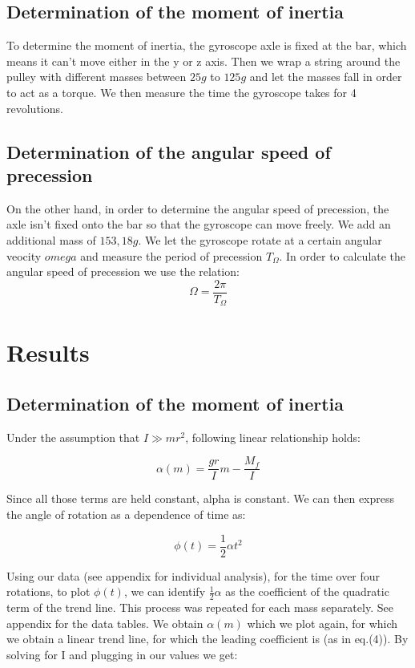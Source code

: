 \documentclass{scrartcl}
\begin{document}
\subsection{Determination of the moment of inertia}
To determine the moment of inertia, the gyroscope axle is fixed at the bar, which means it can't move either in the y or z axis. Then we wrap a string around the pulley with different masses between $25g$ to $125g$ and let the masses fall in order to act as a torque. We then measure the time the gyroscope takes for 4 revolutions. 

\subsection{Determination of the angular speed of precession}
On the other hand, in order to determine the angular speed of precession, the axle isn't fixed onto the bar so that the gyroscope can move freely. We add an additional mass of $153,18g$. We let the gyroscope rotate at a certain angular veocity $omega$ and measure the period of precession $T_{\Omega}$. In order to calculate the angular speed of precession we use the relation:
\begin{equation}
	\Omega = \frac{2\pi}{T_{\Omega}}
	\label{eq3}
\end{equation}

\section{Results}

\subsection{Determination of the moment of inertia}

    Under the assumption that $I \gg mr^2$, following linear relationship holds:
    
    \begin{equation}
        \alpha (m) = \frac{gr}{I} m - \frac{M_f}{I}
    \end{equation}
    
    Since all those terms are held constant, alpha is constant. We can then express the angle of rotation as a dependence of time as:
    
    \begin{equation}
        \phi(t) = \frac{1}{2} \alpha t^2
    \end{equation}

    Using our data (see appendix for individual analysis), for the time over four rotations, to plot $\phi(t)$, we can identify
    $\frac{1}{2} \alpha$ as the coefficient of the quadratic term of the trend line. This process was repeated for each mass separately. See appendix for the data tables. We obtain $\alpha(m)$ which we plot again, for which we obtain a linear trend line, for which the leading coefficient is (as in eq.(4)). By solving for I and plugging in our values we get:
    
\end{document}
